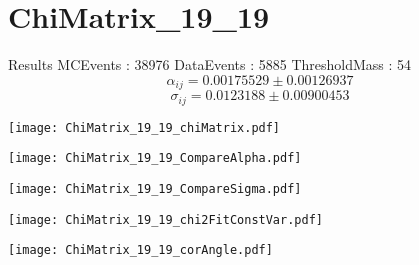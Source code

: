 \documentclass[a4paper,12pt]{article}
\begin{document}
\section{ChiMatrix\_19\_19}
\begin{minipage}{0.49\linewidth} Results \newline
MCEvents : 38976\newline
DataEvents : 5885 \newline
ThresholdMass : 54\\
$$\alpha_{ij} = 0.00175529\pm 0.00126937$$
$$\sigma_{ij} = 0.0123188\pm 0.00900453$$
\end{minipage}\hfill
\begin{minipage}{0.49\linewidth} 
\texttt{[image: ChiMatrix\_19\_19\_chiMatrix.pdf]}\\
\end{minipage}
\hfill
\begin{minipage}{0.49\linewidth} 
\texttt{[image: ChiMatrix\_19\_19\_CompareAlpha.pdf]}\\
\end{minipage}
\hfill
\begin{minipage}{0.49\linewidth} 
\texttt{[image: ChiMatrix\_19\_19\_CompareSigma.pdf]}\\
\end{minipage}
\begin{minipage}{0.49\linewidth} 
\texttt{[image: ChiMatrix\_19\_19\_chi2FitConstVar.pdf]}\\
\end{minipage}
\hfill
\begin{minipage}{0.49\linewidth} 
\texttt{[image: ChiMatrix\_19\_19\_corAngle.pdf]}\\
\end{minipage}
\end{document}
